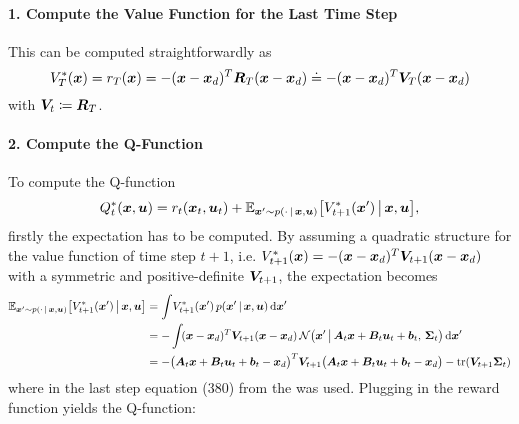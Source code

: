 				\paragraph{1. Compute the Value Function for the Last Time Step}
					This can be computed straightforwardly as
					\begin{equation*}
						V_T^\ast(\bm{x}) = r_T(\bm{x}) = -(\bm{x} - \bm{x}_d)^T \bm{R}_T (\bm{x} - \bm{x}_d) \doteq -(\bm{x} - \bm{x}_d)^T \bm{V}_T (\bm{x} - \bm{x}_d)
					\end{equation*}
					with \( \bm{V}_t \coloneqq \bm{R}_T \).

				\paragraph{2. Compute the Q-Function}
					To compute the Q-function
					\begin{equation*}
						Q_t^\ast(\bm{x}, \bm{u}) = r_t(\bm{x}_t, \bm{u}_t) + \mathbb{E}_{\bm{x}' \sim p(\cdot \,\vert\, \bm{x}, \bm{u})}\big[ V_{t + 1}^\ast(\bm{x}') \,\big\vert\, \bm{x}, \bm{u} \big],
					\end{equation*}
					firstly the expectation has to be computed. By assuming a quadratic structure for the value function of time step \(t + 1\), i.e. \( V_{t + 1}^\ast(\bm{x}) = -(\bm{x} - \bm{x}_d)^T \bm{V}_{t + 1} (\bm{x} - \bm{x}_d) \) with a symmetric and positive-definite \( \bm{V}_{t + 1} \), the expectation becomes
					\begin{align*}
						\mathbb{E}_{\bm{x}' \sim p(\cdot \,\vert\, \bm{x}, \bm{u})}\big[ V_{t + 1}^\ast(\bm{x}') \,\big\vert\, \bm{x}, \bm{u} \big]
						 & = \int\! V_{t + 1}^\ast(\bm{x}') \, p(\bm{x}' \,\vert\, \bm{x}, \bm{u}) \dd{\bm{x}'}                                                                                                                             \\
						 & = - \int\! (\bm{x} - \bm{x}_d)^T \bm{V}_{t + 1} (\bm{x} - \bm{x}_d) \, \mathcal{N}\big(\bm{x}' \,\big\vert\, \bm{A}_t \bm{x} + \bm{B}_t \bm{u}_t + \bm{b}_t,\, \bm{\Sigma}_t \big) \dd{\bm{x}'}           \\
						 & = -\big( \bm{A}_t \bm{x} + \bm{B}_t \bm{u}_t + \bm{b}_t - \bm{x}_d \big)^T \bm{V}_{t + 1} \big( \bm{A}_t \bm{x} + \bm{B}_t \bm{u}_t + \bm{b}_t - \bm{x}_d \big) - \tr(\bm{V}_{t + 1} \bm{\Sigma}_t)
					\end{align*}
					where in the last step equation (380) from the \matrixcookbook was used. Plugging in the reward function yields the Q-function:
